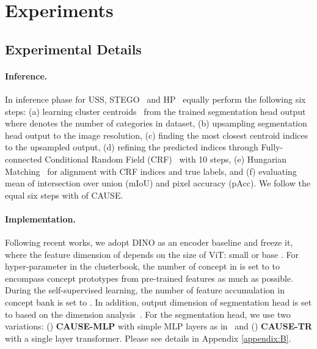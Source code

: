 \documentclass{article} \usepackage{iclr2024_conference,times}
\begin{document}
\section{Experiments}
\label{sec:experiment}
\vspace{-1.5mm}
\subsection{Experimental Details}
\vspace{-1.5mm}
\paragraph{Inference.} In inference phase for USS, STEGO~\citep{hamilton2022unsupervised} and HP~\citep{seong2023leveraging} equally perform the following six steps: (a) learning  cluster centroids~\citep{caron2018deep} from the trained segmentation head output where  denotes the number of categories in dataset, (b) upsampling segmentation head output to the image resolution, (c) finding the most closest centroid indices to the upsampled output, (d) refining the predicted indices through Fully-connected Conditional Random Field (CRF)~\citep{krahenbuhl2011efficient} with 10 steps, (e) Hungarian Matching~\citep{kuhn1955hungarian} for alignment with CRF indices and true labels, and (f) evaluating mean of intersection over union (mIoU) and pixel accuracy (pAcc). We follow the equal six steps with  of CAUSE.

\paragraph{Implementation.} Following recent works, we adopt DINO as an encoder baseline and freeze it, where the feature dimension  of  depends on the size of ViT: small  or base . For hyper-parameter in the clusterbook, the number of concept  in  is set to  to encompass concept prototypes from pre-trained features as much as possible. During the self-supervised learning, the number of feature accumulation  in concept bank is set to . In addition, output dimension  of segmentation head is set to  based on the dimension analysis~\citep{koenig2023uncovering}. For the segmentation head, we use two variations: (\lowercase\expandafter{}) \textbf{CAUSE-MLP} with simple MLP layers as in~\citet{hamilton2022unsupervised} and (\lowercase\expandafter{}) \textbf{CAUSE-TR} with a single layer transformer. Please see details in Appendix \ref{appendix:B}.
\end{document}

